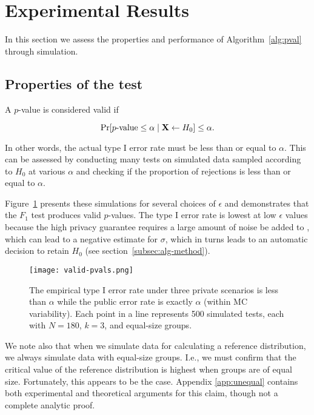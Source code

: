 
\section{Experimental Results}
\label{sec:results}

In this section we assess the properties and performance of Algorithm~\ref{alg:pval} through simulation. 

\subsection{Properties of the test}\label{subsec:properties}

A $p$-value is considered valid if ~\cite{casellaberger2002}

$$
\Pr[p\textrm{-value} \le \alpha \mid \mathbf{X} \leftarrow H_0] \le \alpha.
$$

In other words, the actual type I error rate must be less than or equal to $\alpha$. This can be assessed by conducting many tests on simulated data sampled according to $H_0$ at various $\alpha$ and checking if the proportion of rejections is less than or equal to $\alpha$. 

Figure~\ref{Fig:valid-pvals} presents these simulations for several choices of $\epsilon$ and demonstrates that the $F_1$ test produces valid $p$-values. The type I error rate is lowest at low $\epsilon$ values because the high privacy guarantee requires a large amount of noise be added to \se, which can lead to a negative estimate for $\sigma$, which in turns leads to an automatic decision to retain $H_0$ (see section~\ref{subsec:alg-method}).

\begin{figure}
\centering
\texttt{[image: valid-pvals.png]}
\caption{The empirical type I error rate under three private scenarios is less than $\alpha$ while the public error rate is exactly $\alpha$ (within MC variability). Each point in a line represents 500 simulated tests, each with $N = 180$, $k=3$, and equal-size groups.\label{Fig:valid-pvals}}
\end{figure}

We note also that when we simulate data for calculating a reference distribution, we always simulate data with equal-size groups.  I.e., we must confirm that the critical value of the reference distribution is highest when groups are of equal size.  Fortunately, this appears to be the case.  Appendix \ref{app:unequal} contains both experimental and theoretical arguments for this claim, though not a complete analytic proof.

